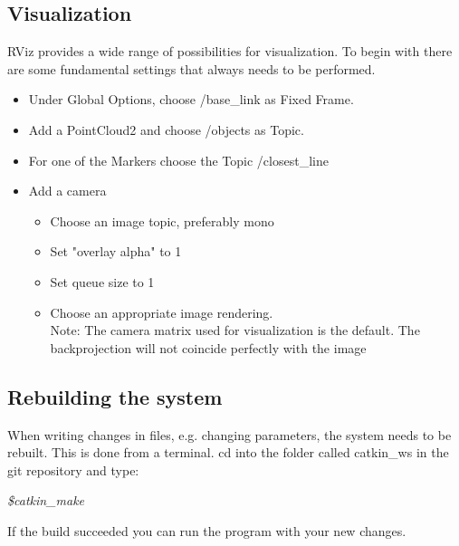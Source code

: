 \documentclass[10pt,a4paper]{article}
\begin{document}
\subsection{Visualization}
RViz provides a wide range of possibilities for visualization.
To begin with there are some fundamental settings that always needs to be performed.
\begin{itemize}

\item Under Global Options, choose /base\_link as Fixed Frame.

\item Add a PointCloud2 and choose /objects as Topic.

\item For one of the Markers choose the Topic /closest\_line

\item Add a camera
\begin{itemize}
\item Choose an image topic, preferably mono 
\item Set "overlay alpha" to 1
\item Set queue size to 1
\item Choose an appropriate image rendering.\\
Note: The camera matrix used for visualization is the default. The backprojection will not coincide perfectly with the image
\end{itemize} 
\end{itemize}

\subsection{Rebuilding the system}
When writing changes in files, e.g. changing parameters, the system needs to be rebuilt. This is done from a terminal. cd into the folder called catkin\_ws in the git repository and type:


\textit{\$catkin\_make}

\noindent If the build succeeded you can run the program with your new changes.
\end{document}
